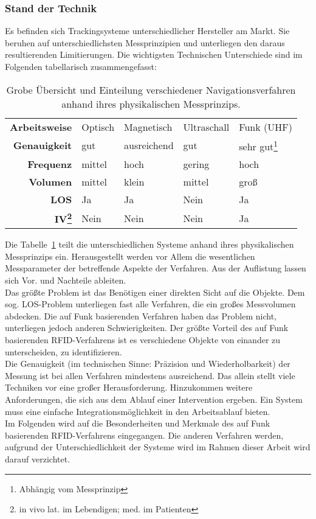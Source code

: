 \subsubsection{Stand der Technik}
Es befinden sich Trackingsysteme unterschiedlicher Hersteller am Markt. Sie beruhen auf unterschiedlichsten Messprinzipien und unterliegen den daraus resultierenden Limitierungen. Die wichtigsten Technischen Unterschiede sind im Folgenden tabellarisch zusammengefasst:
%
\begin{table} [H]
	\begin{center}
		\begin{tabular}{rllll}
			\textbf{Arbeitsweise} & Optisch & Magnetisch & Ultraschall & Funk (UHF) \\
			\textbf{Genauigkeit} & gut & ausreichend & gut & sehr gut\footnote{Abhängig vom Messprinzip} \\
			\textbf{Frequenz} & mittel & hoch & gering & hoch \\
			\textbf{Volumen} & mittel & klein & mittel & groß \\
			\textbf{LOS} & Ja & Ja & Nein & Ja \\
			\textbf{IV\footnote{in vivo lat. im Lebendigen; med. im Patienten}} & Nein   & Nein & Nein & Ja \\
%			
		\end{tabular}
	\end{center}
	\caption[Übersicht Navigationsverfahren]{Grobe Übersicht und Einteilung verschiedener Navigationsverfahren anhand ihres physikalischen Messprinzips.}
	\label{tab:overview_tracking}
\end{table}
%
Die Tabelle~\ref{tab:overview_tracking} teilt die unterschiedlichen Systeme anhand ihres physikalischen Messprinzips ein. Herausgestellt werden vor Allem die wesentlichen Messparameter der betreffende Aspekte der Verfahren. Aus der Auflistung lassen sich Vor. und Nachteile ableiten.\\
Das größte Problem ist das Benötigen einer direkten Sicht auf die Objekte. Dem sog. LOS-Problem unterliegen fast alle Verfahren, die ein großes Messvolumen abdecken. Die auf Funk basierenden Verfahren haben das Problem nicht, unterliegen jedoch anderen Schwierigkeiten. Der größte Vorteil des auf Funk basierenden RFID-Verfahrens ist es verschiedene Objekte von einander zu unterscheiden, zu identifizieren.\\
Die Genauigkeit (im technischen Sinne: Präzision und Wiederholbarkeit) der Messung ist bei allen Verfahren mindestens ausreichend. Das allein stellt viele Techniken vor eine großer Herausforderung. Hinzukommen weitere Anforderungen, die sich aus dem Ablauf einer Intervention ergeben. Ein System muss eine einfache Integrationsmöglichkeit in den Arbeitsablauf bieten.\\
%

Im Folgenden wird auf die Besonderheiten und Merkmale des auf Funk basierenden RFID-Verfahrens eingegangen. Die anderen Verfahren werden, aufgrund der Unterschiedlichkeit der Systeme wird im Rahmen dieser Arbeit wird darauf verzichtet.


